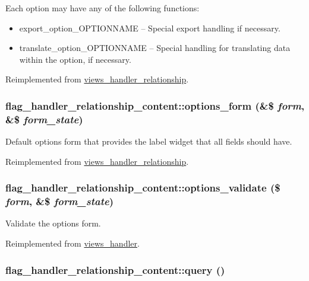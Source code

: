 Each option may have any of the following functions:\begin{itemize}
\item export\_\-option\_\-OPTIONNAME -- Special export handling if necessary.\item translate\_\-option\_\-OPTIONNAME -- Special handling for translating data within the option, if necessary. \end{itemize}


Reimplemented from \hyperlink{classviews__handler__relationship_7e7b7a0056836612aa50a60575a3d549}{views\_\-handler\_\-relationship}.\hypertarget{classflag__handler__relationship__content_16476e401490907a6fadc9af5156d83f}{
\subsubsection[{options\_\-form}]{\setlength{\rightskip}{0pt plus 5cm}flag\_\-handler\_\-relationship\_\-content::options\_\-form (\&\$ {\em form}, \/  \&\$ {\em form\_\-state})}}
\label{classflag__handler__relationship__content_16476e401490907a6fadc9af5156d83f}


Default options form that provides the label widget that all fields should have. 

Reimplemented from \hyperlink{classviews__handler__relationship_08cc3f5947964d936b5e88d198f82c30}{views\_\-handler\_\-relationship}.\hypertarget{classflag__handler__relationship__content_18742b6cac14664ca2880c9b3bf96feb}{
\subsubsection[{options\_\-validate}]{\setlength{\rightskip}{0pt plus 5cm}flag\_\-handler\_\-relationship\_\-content::options\_\-validate (\$ {\em form}, \/  \&\$ {\em form\_\-state})}}
\label{classflag__handler__relationship__content_18742b6cac14664ca2880c9b3bf96feb}


Validate the options form. 

Reimplemented from \hyperlink{classviews__handler_48a7b56e8952d9fcf56e2dec7794bb4e}{views\_\-handler}.\hypertarget{classflag__handler__relationship__content_7fcb01763f0902dafd9f601c0bc1a612}{
\subsubsection[{query}]{\setlength{\rightskip}{0pt plus 5cm}flag\_\-handler\_\-relationship\_\-content::query ()}}
\label{classflag__handler__relationship__content_7fcb01763f0902dafd9f601c0bc1a612}


